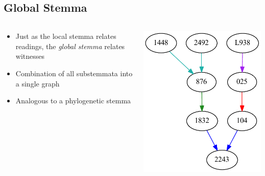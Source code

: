 \documentclass[10pt]{beamer}
\begin{document}
	\subsection{Global Stemma}
	\begin{frame}
		\begin{columns}
			\begin{column}{0.45\textwidth}
				\begin{itemize}
					\item Just as the local stemma relates readings, the \emph{global stemma} relates witnesses
					\item Combination of all substemmata into a single graph
					\item Analogous to a phylogenetic stemma
				\end{itemize}
			\end{column}
			\begin{column}{0.45\textwidth}
				\begin{center}
					\includegraphics[width=\textwidth]{../img/partial-global-stemma.pdf}
				\end{center}
			\end{column}
		\end{columns}
	\end{frame}
\end{document}
